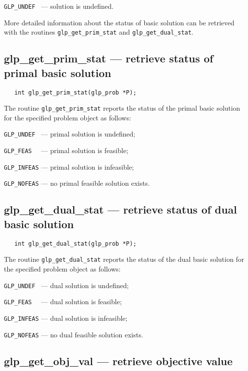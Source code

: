 \verb|GLP_UNDEF | --- solution is undefined.

More detailed information about the status of basic solution can be
retrieved with the routines \verb|glp_get_prim_stat| and
\verb|glp_get_dual_stat|.

\subsection{glp\_get\_prim\_stat --- retrieve status of primal basic
solution}

\synopsis

\begin{verbatim}
   int glp_get_prim_stat(glp_prob *P);
\end{verbatim}

\returns

The routine \verb|glp_get_prim_stat| reports the status of the primal
basic solution for the specified problem object as follows:

\verb|GLP_UNDEF | --- primal solution is undefined;

\verb|GLP_FEAS  | --- primal solution is feasible;

\verb|GLP_INFEAS| --- primal solution is infeasible;

\verb|GLP_NOFEAS| --- no primal feasible solution exists.

\subsection{glp\_get\_dual\_stat --- retrieve status of dual basic
solution}

\synopsis

\begin{verbatim}
   int glp_get_dual_stat(glp_prob *P);
\end{verbatim}

\returns

The routine \verb|glp_get_dual_stat| reports the status of the dual
basic solution for the specified problem object as follows:

\verb|GLP_UNDEF | --- dual solution is undefined;

\verb|GLP_FEAS  | --- dual solution is feasible;

\verb|GLP_INFEAS| --- dual solution is infeasible;

\verb|GLP_NOFEAS| --- no dual feasible solution exists.

\subsection{glp\_get\_obj\_val --- retrieve objective value}

